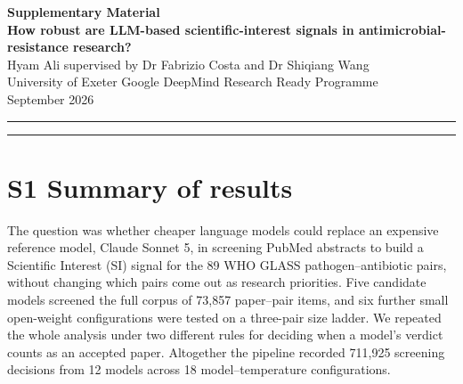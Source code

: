 \documentclass[11pt,a4paper]{article}
\begin{document}
{\sffamily\bfseries\color{accent}\large Supplementary Material}\\[4pt]
{\sffamily\bfseries\LARGE\color{ink} How robust are LLM-based scientific-interest signals in antimicrobial-resistance research?}\\[8pt]
{\small Hyam Ali \textperiodcentered{} supervised by Dr Fabrizio Costa and Dr Shiqiang Wang\\ University of Exeter \textperiodcentered{} Google DeepMind Research Ready Programme\\ September 2026}
\vspace{6pt}\hrule\vspace{4pt}
{\small\tableofcontents}
\vspace{4pt}\hrule
\section{S1  Summary of results}
The question was whether cheaper language models could replace an expensive reference model, Claude Sonnet 5, in screening PubMed abstracts to build a Scientific Interest (SI) signal for the 89 WHO GLASS pathogen--antibiotic pairs, without changing which pairs come out as research priorities. Five candidate models screened the full corpus of 73,857 paper--pair items, and six further small open-weight configurations were tested on a three-pair size ladder. We repeated the whole analysis under two different rules for deciding when a model's verdict counts as an accepted paper. Altogether the pipeline recorded 711,925 screening decisions from 12 models across 18 model--temperature configurations.
\end{document}
